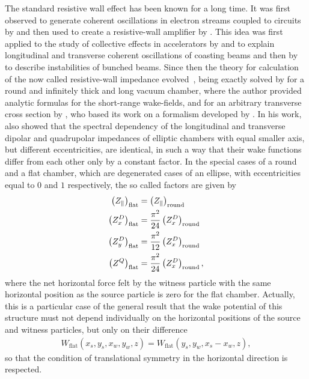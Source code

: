     The standard resistive wall effect has been known for a long time. It was first observed to generate coherent oscillations in electron streams coupled to circuits by  and then used to create a resistive-wall amplifier by . This idea was first applied to the study of collective effects in accelerators by  and  to explain longitudinal and transverse coherent oscillations of coasting beams and then by  to describe instabilities of bunched beams. Since then the theory for calculation of the now called resistive-wall impedance evolved~\cite{Chao1993}, being exactly solved by  for a round and infinitely thick and long vacuum chamber, where the author provided analytic formulas for the short-range wake-fields, and for an arbitrary transverse cross section by , who based its work on a formalism developed by . In his work,  also showed that the spectral dependency of the longitudinal and transverse dipolar and quadrupolar impedances of elliptic chambers with equal smaller axis, but different eccentricities, are identical, in such a way that their wake functions differ from each other only by a constant factor. In the special cases of a round and a flat chamber, which are degenerated cases of an ellipse, with eccentricities equal to $0$ and $1$ respectively, the so called  factors are given by
    \begin{align}
        \left(Z_\parallel\right)_\text{flat} &=
                        \left(Z_\parallel\right)_\text{round}\\
        \left(Z_x^D\right)_\text{flat} &= \frac{\pi^2}{24}
                        \left(Z_x^D\right)_\text{round}\\
        \left(Z_y^D\right)_\text{flat} &= \frac{\pi^2}{12}
                        \left(Z_x^D\right)_\text{round}\\
        \left(Z^Q\right)_\text{flat} &= \frac{\pi^2}{24}
                        \left(Z_x^D\right)_\text{round},
    \end{align}
    where the net horizontal force felt by the witness particle with the same horizontal position as the source particle is zero for the flat chamber. Actually, this is a particular case of the general result that the wake potential of this structure must not depend individually on the horizontal positions of the source and witness particles, but only on their difference
    \begin{align}\nonumber
        W_\text{flat}(x_s,y_s,x_w,y_w,z)=W_\text{flat}(y_s,y_w,x_s-x_w,z),
    \end{align}
    so that the condition of translational symmetry in the horizontal direction is respected.

